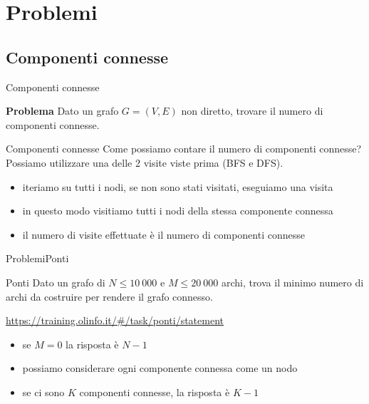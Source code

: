 \documentclass[compress]{beamer}
\begin{document}
\section{Problemi}

\subsection{Componenti connesse}
\begin{frame}{Componenti connesse}
  \begin{block}{\textbf{Problema}}
    Dato un grafo $G = (V, E)$ non diretto, trovare il numero di componenti connesse.
  \end{block}
  \begin{center}
  
  \end{center}
\end{frame}

\begin{frame}{Componenti connesse}
    Come possiamo contare il numero di componenti connesse?
    \pause
    Possiamo utilizzare una delle 2 visite viste prima (BFS e DFS).
    \pause
    \begin{itemize}
        \item iteriamo su tutti i nodi, se non sono stati visitati, eseguiamo una visita
        \pause
        \item in questo modo visitiamo tutti i nodi della stessa componente connessa
        \pause
        \item il numero di visite effettuate \`e il numero di componenti connesse
    \end{itemize}
  \end{frame}

\begin{frame}{Problemi}{Ponti}
    \begin{exampleblock}{Ponti}
        Dato un grafo di $N \leq 10 \ 000$ e $M \leq 20 \ 000$ archi, trova il minimo numero di archi da costruire per rendere il grafo connesso.
    \end{exampleblock}
    \small{\underline{\url{https://training.olinfo.it/\#/task/ponti/statement}}}
    \pause
    \begin{itemize}
        \item se $M = 0$ la risposta \`e $N-1$
        \pause
        \item possiamo considerare ogni componente connessa come un nodo
        \pause
        \item se ci sono $K$ componenti connesse, la risposta \`e $K-1$
    \end{itemize}
\end{frame}
\end{document}
